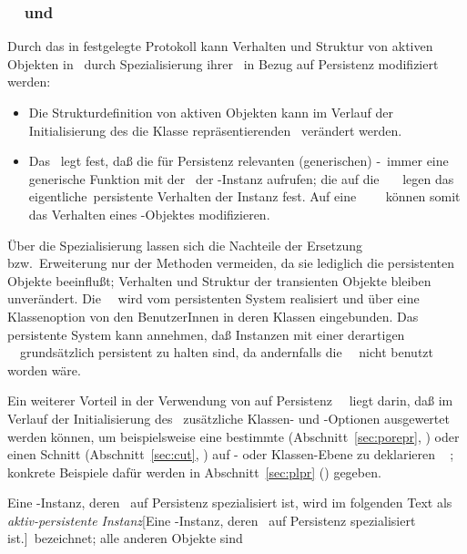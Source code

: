 \subsubsection{\protect\Spc\ \protect\clsmc[n]\ und
\protect\spc\ \protect\mtd[n]}
%
Durch das in \cite{bib:amop91} festgelegte Protokoll kann Verhalten
und Struktur von aktiven Objekten in \clos\ durch Spezialisierung
ihrer \clsmc\ in Bezug auf Persistenz modifiziert werden:
\begin{itemize}
%
\item Die Strukturdefinition von aktiven Objekten kann im Verlauf der
Initialisierung des die Klasse repr\"{a}sentierenden
\clsmo[es]\ ver\"{a}ndert werden.
%
\item Das \mop\ legt fest, da\ss{} die f\"{u}r Persistenz relevanten
(generischen) \std-\fn[en]\ immer eine generische Funktion mit der
\clsmc\ der \clos-Instanz aufrufen; die auf die
\clsmc\ \spc[n]\ \mtd[n]\ legen das \rglq{}eigentliche\rgrq\ persistente
Verhalten der Instanz fest. Auf eine
\spc\ \clsmc\ \spc\ \mtd[n]\ k\"{o}nnen somit das Verhalten eines
\clos-Objektes modifizieren.
%
\end{itemize}
%
\"{U}ber die Spezialisierung lassen sich die Nachteile der Ersetzung
bzw.\ Erweiterung nur der Methoden vermeiden, da sie lediglich die
persistenten Objekte beeinflu\ss{}t; Verhalten und Struktur der
transienten Objekte bleiben unver\"{a}ndert. Die \spc\ \clsmc\ wird vom
persistenten System realisiert und \"{u}ber eine Klassenoption von den
BenutzerInnen in deren Klassen eingebunden. Das persistente
System kann annehmen, da\ss{} Instanzen mit einer derartigen
\spc[n]\ \clsmc\ grunds\"{a}tzlich persistent zu halten sind, da
andernfalls die \spc\ \clsmc\ nicht benutzt worden w\"{a}re.
%
\par{}Ein weiterer Vorteil in der Verwendung von auf Persistenz
\spc[n]\ \clsmc[n]\ liegt darin, da\ss{} im Verlauf der Initialisierung
des \clsmo[es]\ zus\"{a}tzliche Klassen- und \Slt\/-Optionen ausgewertet
werden k\"{o}nnen, um beispielsweise 
eine bestimmte \representationform{} (Abschnitt~\ref{sec:porepr},
\citepage{\pageref{sec:porepr}}) 
oder einen Schnitt (Abschnitt~\ref{sec:cut},
\citepage{\pageref{sec:cut}}) auf \Slt\/- oder Klassen-Ebene zu
deklarieren\ifbericht%
\ \cite[]{bib:ki94a}\else%
; konkrete Beispiele daf\"{u}r werden in
Abschnitt~\ref{sec:plpr} (\citepage{\pageref{sec:plpr}}) gegeben\fi.
%
\par{}Eine \clos-Instanz, deren \clsmc\ auf Persistenz spezialisiert
ist, wird im folgenden Text als {\em aktiv-persistente
Instanz\/}[{Eine
\protect\clos-Instanz, deren \protect\clsmc\ auf Persistenz
spezialisiert ist.}]\ bezeichnet; alle anderen Objekte sind
